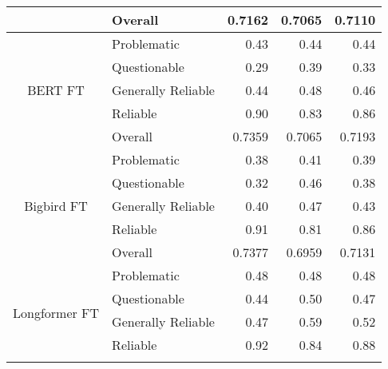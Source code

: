 \begin{table}[htbp]
\begin{longtable}{| c | l | r | r | r |}
                                                          & Overall            & 0.7162             & 0.7065          & 0.7110          \\
        \hline
        \multirow{5}{*}{BERT FT}                          & Problematic        & 0.43               & 0.44            & 0.44            \\
                                                          & Questionable       & 0.29               & 0.39            & 0.33            \\
                                                          & Generally Reliable & 0.44               & 0.48            & 0.46            \\
                                                          & Reliable           & 0.90               & 0.83            & 0.86            \\\cline{2-5}
                                                          & Overall            & 0.7359             & 0.7065          & 0.7193          \\
        \hline
        \multirow{5}{*}{Bigbird FT}                       & Problematic        & 0.38               & 0.41            & 0.39            \\
                                                          & Questionable       & 0.32               & 0.46            & 0.38            \\
                                                          & Generally Reliable & 0.40               & 0.47            & 0.43            \\
                                                          & Reliable           & 0.91               & 0.81            & 0.86            \\\cline{2-5}
                                                          & Overall            & 0.7377             & 0.6959          & 0.7131          \\
        \hline
        \multirow{5}{*}{Longformer FT}                    & Problematic        & 0.48               & 0.48            & 0.48            \\
                                                          & Questionable       & 0.44               & 0.50            & 0.47            \\
                                                          & Generally Reliable & 0.47               & 0.59            & 0.52            \\
                                                          & Reliable           & 0.92               & 0.84            & 0.88            \\\cline{2-5}

\end{longtable}
\end{table}
